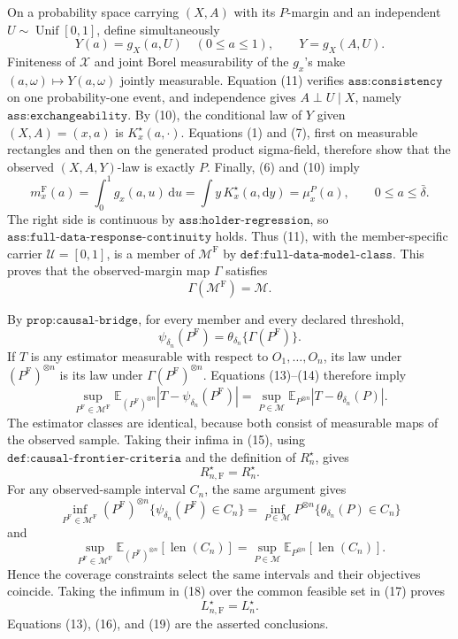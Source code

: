 On a probability space carrying \((X,A)\) with its \(P\)-margin and an independent \(U\sim\operatorname{Unif}[0,1]\), define simultaneously
\[
 Y(a)=g_X(a,U)\quad(0\leq a\leq1),
 \qquad Y=g_X(A,U). \tag{11}
\]
Finiteness of \(\mathcal X\) and joint Borel measurability of the \(g_x\)'s make \((a,\omega)\mapsto Y(a,\omega)\) jointly measurable.  Equation (11) verifies \(\texttt{ass:consistency}\) on one probability-one event, and independence gives \(A\perp U\mid X\), namely \(\texttt{ass:exchangeability}\).  By (10), the conditional law of \(Y\) given \((X,A)=(x,a)\) is \(K_x^\star(a,\cdot)\).  Equations (1) and (7), first on measurable rectangles and then on the generated product sigma-field, therefore show that the observed \((X,A,Y)\)-law is exactly \(P\).  Finally, (6) and (10) imply
\[
 m_x^{\mathrm F}(a)
 =\int_0^1g_x(a,u)\,\mathrm du
 =\int y\,K_x^\star(a,\mathrm dy)
 =\mu_x^P(a),
 \qquad 0\leq a\leq\bar\delta. \tag{12}
\]
The right side is continuous by \(\texttt{ass:holder-regression}\), so \(\texttt{ass:full-data-response-continuity}\) holds.  Thus (11), with the member-specific carrier \(\mathcal U=[0,1]\), is a member of \(\mathcal M^{\mathrm F}\) by \(\texttt{def:full-data-model-class}\).  This proves that the observed-margin map \(\Gamma\) satisfies
\[
 \Gamma(\mathcal M^{\mathrm F})=\mathcal M. \tag{13}
\]

By \(\texttt{prop:causal-bridge}\), for every member and every declared threshold,
\[
 \psi_{\delta_n}(P^{\mathrm F})
 =\theta_{\delta_n}\{\Gamma(P^{\mathrm F})\}. \tag{14}
\]
If \(T\) is any estimator measurable with respect to \(O_1,\ldots,O_n\), its law under \((P^{\mathrm F})^{\otimes n}\) is its law under \(\Gamma(P^{\mathrm F})^{\otimes n}\).  Equations (13)--(14) therefore imply
\[
 \sup_{P^{\mathrm F}\in\mathcal M^{\mathrm F}}
 \mathbb E_{(P^{\mathrm F})^{\otimes n}}
 |T-\psi_{\delta_n}(P^{\mathrm F})|
 =\sup_{P\in\mathcal M}
 \mathbb E_{P^{\otimes n}}|T-\theta_{\delta_n}(P)|. \tag{15}
\]
The estimator classes are identical, because both consist of measurable maps of the observed sample.  Taking their infima in (15), using \(\texttt{def:causal-frontier-criteria}\) and the definition of \(R_n^\star\), gives
\[
 R_{n,\mathrm F}^\star=R_n^\star. \tag{16}
\]
For any observed-sample interval \(C_n\), the same argument gives
\[
 \inf_{P^{\mathrm F}\in\mathcal M^{\mathrm F}}
 (P^{\mathrm F})^{\otimes n}\{\psi_{\delta_n}(P^{\mathrm F})\in C_n\}
 =\inf_{P\in\mathcal M}P^{\otimes n}\{\theta_{\delta_n}(P)\in C_n\} \tag{17}
\]
and
\[
 \sup_{P^{\mathrm F}\in\mathcal M^{\mathrm F}}
 \mathbb E_{(P^{\mathrm F})^{\otimes n}}[\operatorname{len}(C_n)]
 =\sup_{P\in\mathcal M}
 \mathbb E_{P^{\otimes n}}[\operatorname{len}(C_n)]. \tag{18}
\]
Hence the coverage constraints select the same intervals and their objectives coincide.  Taking the infimum in (18) over the common feasible set in (17) proves
\[
 L_{n,\mathrm F}^\star=L_n^\star. \tag{19}
\]
Equations (13), (16), and (19) are the asserted conclusions.
